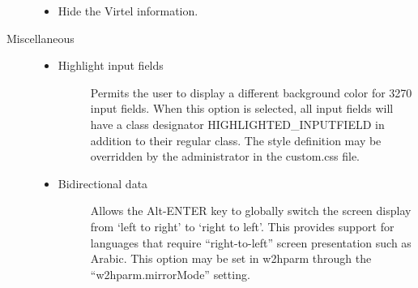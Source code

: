 \documentclass[letterpaper,10pt,english]{sphinxmanual}
\begin{document}
\begin{description}
\begin{itemize}
\item {} 
Hide the Virtel information.

\end{itemize}

\item[{Miscellaneous}] \leavevmode\begin{itemize}
\item {} \begin{description}
\item[{Highlight input fields}] \leavevmode
Permits the user to display a different background color for 3270 input fields. When this option is selected, all input fields will have a class designator HIGHLIGHTED\_INPUTFIELD in addition to their regular class. The style definition may be overridden by the administrator in the custom.css file.

\end{description}

\item {} \begin{description}
\item[{Bidirectional data}] \leavevmode
Allows the Alt-ENTER key to globally switch the screen display from ‘left to right’ to ‘right to left’. This provides support for languages that require “right-to-left” screen presentation such as Arabic. This option may be set in w2hparm through the “w2hparm.mirrorMode” setting.

\end{description}

\end{itemize}

\end{description}


\end{document}
